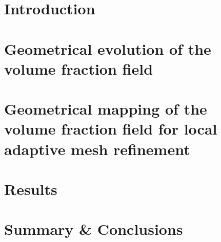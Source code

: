 \documentclass[a4paper,twoside]{amsproc}%
\numberwithin{equation}{section}
\begin{document}
\maketitle


\section{Introduction}
\label{section:introduction}


\section{Geometrical evolution of the volume fraction field}
\label{section:geometrical-algorithm}


\section{Geometrical mapping of the volume fraction field for local adaptive mesh refinement}
\label{section:geometrical-mapping}


\section{Results}
\label{section:results}


\section{Summary \& Conclusions}




\end{document}
